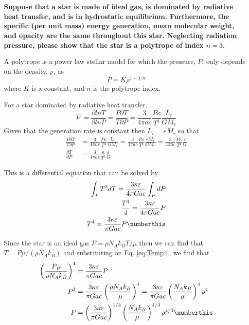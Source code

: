 \section{}
\textbf{Suppose that a star is made of ideal gas, is dominated by radiative heat transfer, and is in hydrostatic equilibrium. Furthermore, the specific (per unit mass) energy generation, mean molecular weight, and opacity are the same throughout this star.
Neglecting radiation pressure, please show that the star is a polytrope of index $n = 3$.}

A polytrope is a power law stellar model for which the pressure, $P$, only depends on the density, $\rho$, as
\begin{equation}
    P = K \rho^{1 + 1/n}
    \label{eq:polytrope}
\end{equation}
where $K$ is a constant,  and $n$ is the polytrope index. 

For a star dominated by radiative heat transfer, 
\begin{equation*}
    \nabla = \frac{\partial ln T}{\partial ln P} = \frac{P \partial T}{T \partial P} = \frac{3}{4\pi ac}\frac{P\kappa}{T^4}\frac{L_r}{GM_r}
\end{equation*}
Given that the generation rate is constant then $L_r= \varepsilon M_r$ so that 
\begin{align*}
     \frac{P \partial T}{T \partial P} &= \frac{3}{4\pi ac}\frac{P\kappa}{T^4}\frac{L_r}{GM_r} = \frac{3}{4\pi ac}\frac{P\kappa}{T^4}\frac{\varepsilon M_r}{GM_r} = \frac{3}{4\pi ac}\frac{P\kappa}{T^4}\frac{\varepsilon }{G}\\
     \frac{dT}{dP} &= \frac{3}{4\pi ac}\frac{\kappa}{T^3}\frac{\varepsilon }{G}
\end{align*}

This is a differential equation that can be solved by
\begin{align*}
    \int_T T^3dT = \frac{3\kappa\varepsilon}{4\pi Gac}\int_P dP\\
    \frac{T^4}{4} = \frac{3\kappa\varepsilon}{4\pi Gac}P\\
    T^4 = \frac{3\kappa\varepsilon}{\pi Gac}P \numberthis\label{eq:Temp4}
\end{align*}

Since the star is an ideal gas $P = \rho N_A k_B T / \mu$ then we can find that $T= P \mu / (\rho N_A k_B)$ and substituting on Eq. \ref{eq:Temp4}, we find that
\begin{align*}
    \left(\frac{P\mu}{\rho N_A k_B}\right)^4 &= \frac{3\kappa\varepsilon}{\pi Gac}P \\
    P^3 &= \frac{3\kappa\varepsilon}{\pi Gac}\left(\frac{\rho N_A k_B}{\mu}\right)^{4} = \frac{3\kappa\varepsilon}{\pi Gac}\left(\frac{N_A k_B}{\mu}\right)^{4} \rho^4\\
    P &= \left(\frac{3\kappa\varepsilon}{\pi Gac}\right)^{1/3}\left(\frac{N_A k_B}{\mu}\right)^{4/3}\rho^{4/3}\numberthis\label{eq:poly4/3}
\end{align*}

